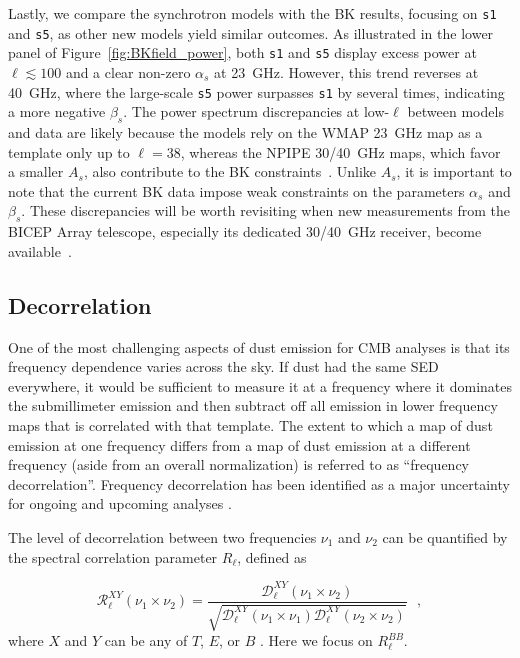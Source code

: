 \documentclass[twocolumn]{aastex631}
\begin{document}
Lastly, we compare the synchrotron models with the BK results, focusing on \texttt{s1} and \texttt{s5}, as other new models yield similar outcomes. As illustrated in the lower panel of Figure~\ref{fig:BKfield_power}, both \texttt{s1} and \texttt{s5} display excess power at $\ell \lesssim 100$ and a clear non-zero $\alpha_s$ at 23~GHz. However, this trend reverses at 40~GHz, where the large-scale \texttt{s5} power surpasses \texttt{s1} by several times, indicating a more negative $\beta_s$. The power spectrum discrepancies at low-$\ell$ between models and data are likely because the models rely on the WMAP 23~GHz map as a template only up to $\ell = 38$, whereas the NPIPE 30/40~GHz maps, which favor a smaller $A_s$, also contribute to the BK constraints~\citep[][Figure~21]{Ade:2021}. Unlike $A_s$, it is important to note that the current BK data impose weak constraints on the parameters $\alpha_s$ and $\beta_s$. These discrepancies will be worth revisiting when new measurements from the BICEP Array telescope, especially its dedicated 30/40~GHz receiver, become available~\citep{Moncelsi:2020}.

\subsection{Decorrelation} \label{subsec:decorrelation}

One of the most challenging aspects of dust emission for CMB analyses is that its frequency dependence varies across the sky. If dust had the same SED everywhere, it would be sufficient to measure it at a frequency where it dominates the submillimeter emission and then subtract off all emission in lower frequency maps that is correlated with that template. The extent to which a map of dust emission at one frequency differs from a map of dust emission at a different frequency (aside from an overall normalization) is referred to as ``frequency decorrelation''. Frequency decorrelation has been identified as a major uncertainty for ongoing and upcoming analyses \citep{Ade:2021}.

The level of decorrelation between two frequencies $\nu_1$ and $\nu_2$ can be quantified by the spectral correlation parameter $R_\ell$, defined as

\begin{equation} \label{eq:R_ell}
    \mathcal{R}^{XY}_\ell(\nu_1\times\nu_2) = \frac{\mathcal{D}_\ell^{XY}(\nu_1\times\nu_2)}{\sqrt{\mathcal{D}_\ell^{XY}(\nu_1\times\nu_1)\mathcal{D}_\ell^{XY}(\nu_2\times\nu_2)}}
    ~~~,
\end{equation}
where $X$ and $Y$ can be any of $T$, $E$, or $B$ \citep{planck2016-L}. Here we focus on $R_\ell^{BB}$.
\end{document}

